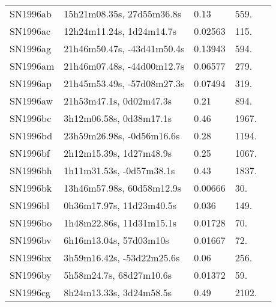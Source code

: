 \begin{longtable}{lllll}
         SN1996ab &      15h21m08.35s, 27d55m36.8s &     0.13 &           559. &    \citet{1996IAUC.6405A...1M} \\
         SN1996ac &       12h24m11.24s, 1d24m14.7s &  0.02563 &           115. &    \citet{1998ApJS..119..277G} \\
         SN1996ag &     21h46m50.47s, -43d41m50.4s &  0.13943 &           594. &  \citet{2009AandA...495..707C} \\
         SN1996am &     21h46m07.48s, -44d00m12.7s &  0.06577 &           279. &  \citet{1998AandAS..129..399K} \\
         SN1996ap &     21h45m53.49s, -57d08m27.3s &  0.07494 &           319. &  \citet{1998AandAS..129..399K} \\
         SN1996aw &        21h53m47.1s, 0d02m47.3s &     0.21 &           894. &    \citet{1996IAUC.6490A...1:} \\
         SN1996bc &        3h12m06.58s, 0d38m17.1s &     0.46 &          1967. &    \citet{1996IAUC.6490A...1:} \\
         SN1996bd &      23h59m26.98s, -0d56m16.6s &     0.28 &          1194. &    \citet{1996IAUC.6490A...1:} \\
         SN1996bf &        2h12m15.39s, 1d27m48.9s &     0.25 &          1067. &    \citet{1996IAUC.6490A...1:} \\
         SN1996bh &       1h11m31.53s, -0d57m38.1s &     0.43 &          1837. &    \citet{1996IAUC.6490A...1:} \\
         SN1996bk &      13h46m57.98s, 60d58m12.9s &  0.00666 &            30. &    \citet{2011MNRAS.413..813C} \\
         SN1996bl &       0h36m17.97s, 11d23m40.5s &    0.036 &           149. &    \citet{1996IAUC.6492A...1P} \\
         SN1996bo &       1h48m22.86s, 11d31m15.1s &  0.01728 &            70. &    \citet{1991RC3.9.C...0000d} \\
         SN1996bv &         6h16m13.04s, 57d03m10s &  0.01667 &            72. &    \citet{1991RC3.9.C...0000d} \\
         SN1996bx &      3h59m16.42s, -53d22m25.6s &     0.06 &           256. &    \citet{1998AJ....115...26R} \\
         SN1996by &        5h58m24.7s, 68d27m10.6s &  0.01372 &            59. &    \citet{1991RC3.9.C...0000d} \\
         SN1996cg &        8h24m13.33s, 3d24m58.5s &     0.49 &          2102. &    \citet{1999ApJ...517..565P} \\

\end{longtable}
